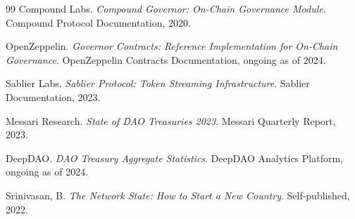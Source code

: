 \documentclass[11pt,a4paper]{article}
\theoremstyle{remark}
\begin{document}
\begin{thebibliography}{99}
Compound Labs.
\newblock \emph{Compound Governor: On-Chain Governance Module}.
\newblock Compound Protocol Documentation, 2020.

OpenZeppelin.
\newblock \emph{Governor Contracts: Reference Implementation for
  On-Chain Governance}.
\newblock OpenZeppelin Contracts Documentation, ongoing as of 2024.

Sablier Labs.
\newblock \emph{Sablier Protocol: Token Streaming Infrastructure}.
\newblock Sablier Documentation, 2023.

Messari Research.
\newblock \emph{State of DAO Treasuries 2023}.
\newblock Messari Quarterly Report, 2023.

DeepDAO.
\newblock \emph{DAO Treasury Aggregate Statistics}.
\newblock DeepDAO Analytics Platform, ongoing as of 2024.

Srinivasan, B.
\newblock \emph{The Network State: How to Start a New Country}.
\newblock Self-published, 2022.

\end{thebibliography}
\end{document}
